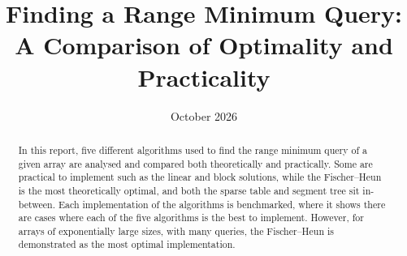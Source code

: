 \documentclass{article}
\title{Finding a Range Minimum Query: A Comparison of Optimality and Practicality}
\date{October 2026}
\theoremstyle{definition}
\begin{document}
\maketitle

\begin{abstract}
In this report, five different algorithms used to find the range minimum query of a given array are analysed and compared both theoretically and practically.  Some are practical to implement such as the linear and block solutions, while the Fischer--Heun is the most theoretically optimal, and both the sparse table and segment tree sit in-between.  Each implementation of the algorithms is benchmarked, where it shows there are cases where each of the five algorithms is the best to implement.  However, for arrays of exponentially large sizes, with many queries, the Fischer--Heun is demonstrated as the most optimal implementation.
\end{abstract}
\end{document}
